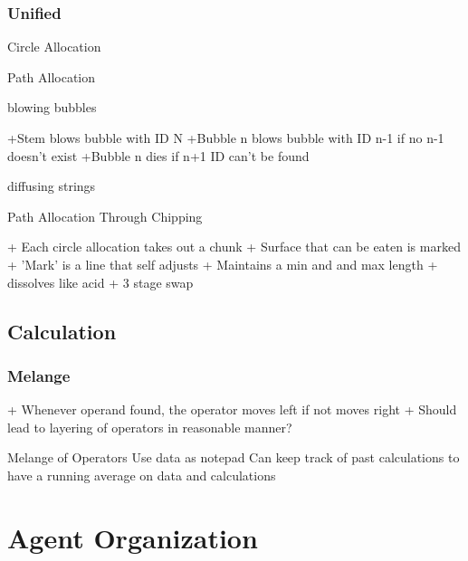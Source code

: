 \documentclass[article,12pt,oneside]{memoir}
\begin{document}
\subsection{Unified}

Circle Allocation

Path Allocation

blowing bubbles

+Stem blows bubble with ID N
+Bubble n blows bubble with ID n-1 if no n-1 doesn't exist
+Bubble n dies if n+1 ID can't be found 

diffusing strings

Path Allocation Through Chipping

+ Each circle allocation takes out a chunk
+ Surface that can be eaten is marked
+ 'Mark' is a line that self adjusts
+ Maintain​s a min and and max length
+ dissolves like acid
+ 3 stage swap


\section{Calculation}


\subsection{Melange}

+ Whenever operand found, the operator moves left if not moves right
+ Should lead to layering of operators in reasonable manner?

Melange of Operators Use data as notepad
Can keep track of past calculations to have a running average on data and calculations


\pagebreak
\chapter{Agent Organization}
\end{document}
